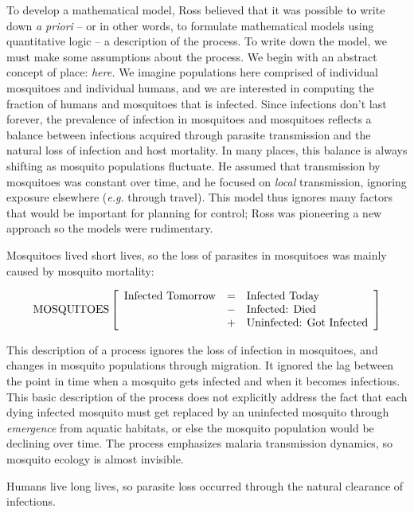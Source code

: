 \documentclass[
]{book}
\begin{document}
To develop a mathematical model, Ross believed that it was possible to write down \emph{a priori} -- or in other words, to formulate mathematical models using quantitative logic -- a description of the process.
To write down the model, we must make some assumptions about the process.
We begin with an abstract concept of place: \emph{here.}
We imagine populations here comprised of individual mosquitoes and individual humans, and we are interested in computing the fraction of humans and mosquitoes that is infected.
Since infections don't last forever, the prevalence of infection in mosquitoes and mosquitoes reflects a balance between infections acquired through parasite transmission and the natural loss of infection and host mortality.
In many places, this balance is always shifting as mosquito populations fluctuate.
He assumed that transmission by mosquitoes was constant over time, and he focused on \emph{local} transmission, ignoring exposure elsewhere (\emph{e.g.} through travel).
This model thus ignores many factors that would be important for planning for control; Ross was pioneering a new approach so the models were rudimentary.

Mosquitoes lived short lives, so the loss of parasites in mosquitoes was mainly caused by mosquito mortality:

\[
\mbox{MOSQUITOES} 
\\ \; \\
\left[
\begin{array}{rcl}
\mbox{Infected Tomorrow} &=& \mbox{Infected Today} \\
&-&\mbox{Infected: Died}\\
&+&\mbox{Uninfected: Got Infected}\\
\end{array} \right]
\]

This description of a process ignores the loss of infection in mosquitoes, and changes in mosquito populations through migration.
It ignored the lag between the point in time when a mosquito gets infected and when it becomes infectious.
This basic description of the process does not explicitly address the fact that each dying infected mosquito must get replaced by an uninfected mosquito through \emph{emergence} from aquatic habitats, or else the mosquito population would be declining over time.
The process emphasizes malaria transmission dynamics, so mosquito ecology is almost invisible.

Humans live long lives, so parasite loss occurred through the natural clearance of infections.
\end{document}

